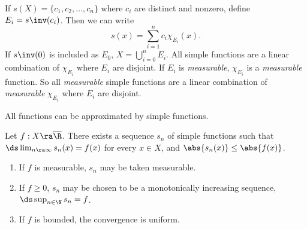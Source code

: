\rmk If \(s(X) = \{c_1, c_2, \dots, c_n\}\) where \(c_i\) are distinct and nonzero, define \(E_i = s\inv(c_i)\). Then we can write
\[
    s(x) = \sum_{i=1}^{n} c_i \chi_{E_i}(x).
\]
If \(s\inv(0)\) is included as \(E_0\), \(X = \bigcup_{i=0}^{n}E_i\). All simple functions are a linear combination of \(\chi_{E_i}\) where \(E_i\) are disjoint. If \(E_i\) is \textit{measurable}, \(\chi_{E_i}\) is a \textit{measurable} function. So all \textit{measurable} simple functions are a linear combination of \textit{measurable} \(\chi_{E_i}\) where \(E_i\) are disjoint.

\pagebreak

All functions can be approximated by simple functions.

 Let \(f : X \ra \overline{\R}\). There exists a sequence \(s_n\) of simple functions such that \(\ds \lim_{n \ra \infty} s_n(x) = f(x)\) for every \(x \in X\), and \(\abs{s_n(x)} \leq \abs{f(x)}\).
\begin{enumerate}
    \item If \(f\) is measurable, \(s_n\) may be taken measurable.
    \item If \(f\geq 0\), \(s_n\) may be chosen to be a monotonically increasing sequence, \(\ds \sup_{n\in \N} s_n = f\).
    \item If \(f\) is bounded, the convergence is uniform.
\end{enumerate}

